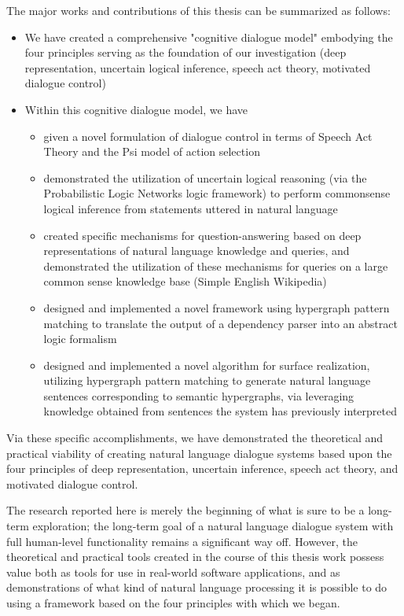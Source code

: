 \begin{englishabstract}
The major works and contributions of this thesis can be summarized as follows:

\begin{itemize}

\item We have created a comprehensive "cognitive dialogue model" embodying the four principles serving as the foundation of our investigation (deep representation, uncertain logical inference, speech act theory, motivated dialogue control)
\item Within this cognitive dialogue model, we have
\begin{itemize}
\item given a novel formulation of dialogue control in terms of Speech Act Theory and the Psi model of action selection
\item demonstrated the utilization of uncertain logical reasoning (via the Probabilistic Logic Networks logic framework) to perform commonsense logical inference from statements uttered in natural language
\item created specific  mechanisms for question-answering based on deep representations of natural language knowledge and queries, and demonstrated the utilization of these mechanisms for queries on a large common sense knowledge base (Simple English Wikipedia)
\item designed and implemented a novel framework using hypergraph pattern matching to translate the output of a dependency parser into an abstract logic formalism
\item designed and implemented a novel algorithm for surface realization, utilizing hypergraph pattern matching to generate natural language sentences corresponding to semantic hypergraphs, via leveraging knowledge obtained from sentences the system has previously interpreted
\end{itemize}

\end{itemize}

Via these specific accomplishments, we have demonstrated the theoretical and practical viability of creating natural language dialogue systems based upon the four principles of deep representation, uncertain inference, speech act theory, and motivated dialogue control.  

The research reported here is merely the beginning of what is sure to be a long-term exploration; the long-term goal of a natural language dialogue system with full human-level functionality remains a significant way off.  However, the theoretical and practical tools created in the course of this thesis work possess value both as tools for use in real-world software applications, and as demonstrations of what kind of natural language processing it is possible to do using a framework based on the four principles with which we began.



\end{englishabstract}
